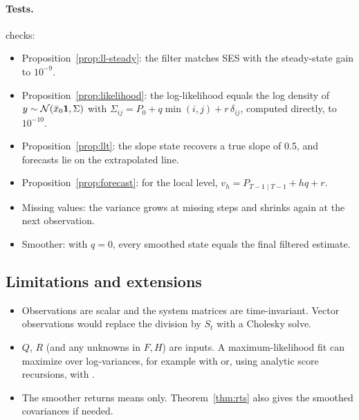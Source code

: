 \documentclass[11pt,a4paper]{article}
\begin{document}
\paragraph{Tests.}  checks:
\begin{itemize}
  \item Proposition~\ref{prop:ll-steady}: the filter matches SES with the steady-state gain to $10^{-9}$.
  \item Proposition~\ref{prop:likelihood}: the log-likelihood equals the log
        density of $y\sim\mathcal{N}(\bar x_0\mathbf1,\Sigma)$ with
        $\Sigma_{ij}=P_0+q\min(i,j)+r\,\delta_{ij}$, computed directly, to $10^{-10}$.
  \item Proposition~\ref{prop:llt}: the slope state recovers a true slope of 0.5,
        and forecasts lie on the extrapolated line.
  \item Proposition~\ref{prop:forecast}: for the local level, $v_h=P_{T-1\mid T-1}+hq+r$.
  \item Missing values: the variance grows at missing steps and shrinks again at the next observation.
  \item Smoother: with $q=0$, every smoothed state equals the final filtered estimate.
\end{itemize}

\subsection{Limitations and extensions}
\begin{itemize}
  \item Observations are scalar and the system matrices are time-invariant. Vector
        observations would replace the division by $S_t$ with a Cholesky solve.
  \item $Q$, $R$ (and any unknowns in $F,H$) are inputs. A maximum-likelihood fit
        can maximize  over log-variances, for example with
         or, using analytic score recursions, with .
  \item The smoother returns means only. Theorem~\ref{thm:rts} also gives the
        smoothed covariances if needed.
\end{itemize}
\end{document}
